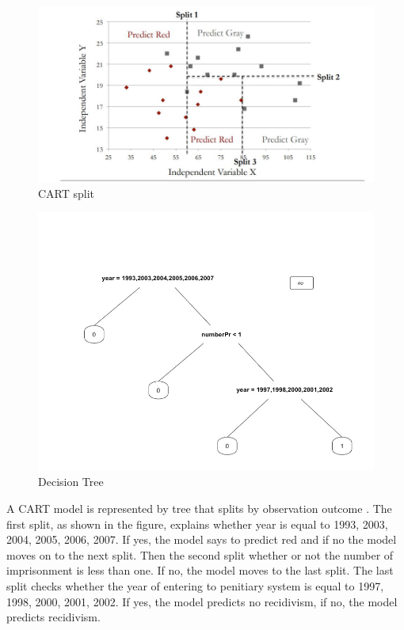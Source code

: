 \documentclass[a4paper,12pt]{article}
\begin{document}
\begin{figure}[h]
\centering
\includegraphics[scale=0.60]{CART.JPG}
\caption{CART split}
\label{fig:Figure 1}
\end{figure}

\begin{figure}[h]
\centering
\includegraphics[scale=0.50]{TREE1.jpg}
\caption{Decision Tree}
\label{fig:Figure 1}
\end{figure}

A CART model is represented by tree that splits by observation outcome \cite{The_Analytics_Edge2016}. The first split, as shown in the figure,  explains whether year is equal to 1993, 2003, 2004, 2005, 2006, 2007. If yes, the model says to predict red and if no the model moves on to the next split. Then the second split whether or not the number of imprisonment is less than one. If no, the model moves to the last split. The last split checks whether the year of entering to penitiary system is equal to 1997, 1998, 2000, 2001, 2002. If yes, the model predicts no recidivism, if no, the model predicts recidivism. 
\end{document}
